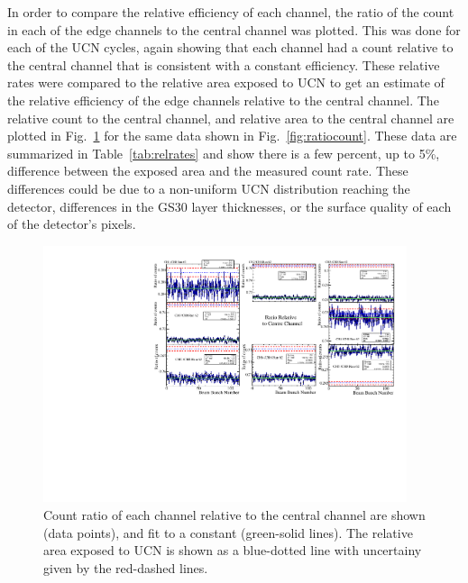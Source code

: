 \documentclass[letter,twocolumn,preprint,3p]{elsarticle}
\begin{document}
In order to compare the relative efficiency of each channel, the ratio
of the count in each of the edge channels to the central channel was
plotted.  This was done for each of the UCN cycles, again showing that
each channel had a count relative to the central channel that is
consistent with a constant efficiency.  These relative rates were
compared to the relative area exposed to UCN to get an estimate of the
relative efficiency of the edge channels relative to the central
channel.  The relative count to the central channel, and relative area
to the central channel are plotted in Fig.~\ref{fig:relratios} for the
same data shown in Fig.~\ref{fig:ratiocount}.  These data are
summarized in Table~\ref{tab:relrates} and show there is a few
percent, up to 5\%, difference between the exposed area and the
measured count rate.  These differences could be due to a non-uniform
UCN distribution reaching the detector, differences in the GS30 layer
thicknesses, or the surface quality of each of the detector's pixels.


\begin{figure}[!htpb]
\centering
\includegraphics[width=0.95\textwidth]{figures/relratios.pdf}
\caption{ Count ratio of each channel relative to the central channel
  are shown (data points), and fit to a constant (green-solid lines).
  The relative area exposed to UCN is shown as a blue-dotted line with
  uncertainy given by the red-dashed lines.}
\label{fig:relratios}
\end{figure}
\end{document}
